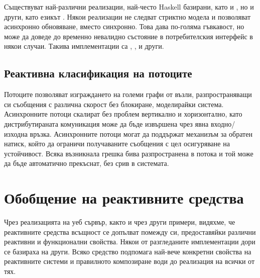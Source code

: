Съществуват най-различни реализации, най-често Haskell базирани, като  и , но и други, като езикът . Някои реализации не следват стриктно модела и позволяват асинхронно обновяване, вместо синхронно. Това дава по-голяма гъвкавост, но може да доведе до временно невалидно състояние в потребителския интерфейс в някои случаи. Такива имплементации са , ,  и други.

\subsection{Реактивна класификация на потоците}

Потоците позволяват изграждането на големи графи от възли, разпространяващи си съобщения с различна скорост без блокиране, моделирайки  система. Асинхронните потоци скалират без проблем вертикално и хоризонтално, като дистрибутираната комуникация може да бъде извършена чрез явна входно/изходна връзка. Асинхронните потоци могат да поддържат механизъм за обратен натиск, който да ограничи получаваните съобщения с цел осигуряване на устойчивост. Всяка възникнала грешка бива разпространена в потока и той може да бъде автоматично прекъснат, без срив в системата.

\section{Обобщение на реактивните средства}

Чрез реализацията на уеб сървър, както и чрез други примери, видяхме, че реактивните средства всъщност се допълват помежду си, предоставяйки различни реактивни и функционални свойства. Някои от разгледаните имплементации дори се базираха на други. Всяко средство подпомага най-вече конкретни свойства на реактивните системи и правилното композиране води до реализация на всички от тях.
